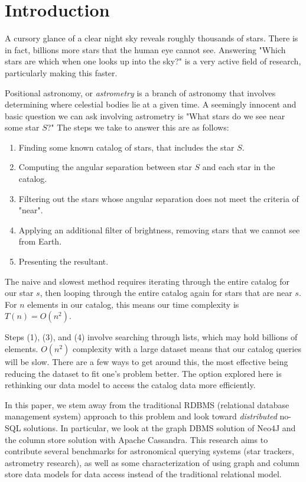 \section{Introduction}\label{sec:introduction}
A cursory glance of a clear night sky reveals roughly thousands of stars.
There is in fact, billions more stars that the human eye cannot see.
Answering "Which stars are which when one looks up into the sky?" is a very active field of research, particularly
making this faster.

Positional astronomy, or \textit{astrometry} is a branch of astronomy that involves determining where celestial
bodies lie at a given time.
A seemingly innocent and basic question we can ask involving astrometry is "What stars do we see near some star $S$?"
The steps we take to answer this are as follows:
\begin{enumerate}
    \item Finding some known catalog of stars, that includes the star $S$.
    \item Computing the angular separation between star $S$ and each star in the catalog.
    \item Filtering out the stars whose angular separation does not meet the criteria of "near".
    \item Applying an additional filter of brightness, removing stars that we cannot see from Earth.
    \item Presenting the resultant.
\end{enumerate}

The naive and slowest method requires iterating through the entire catalog for our star $s$, then looping through the
entire catalog again for stars that are near $s$.
For $n$ elements in our catalog, this means our time complexity is $T(n) = O\left( n^2 \right)$.

Steps (1), (3), and (4) involve searching through lists, which may hold billions of elements.
$O\left(n^2\right)$ complexity with a large dataset means that our catalog queries will be slow.
There are a few ways to get around this, the most effective being reducing the dataset to fit one's problem better.
The option explored here is rethinking our data model to access the catalog data more efficiently.

In this paper, we stem away from the traditional RDBMS (relational database management system) approach to this
problem and look toward \textit{distributed} no-SQL solutions.
In particular, we look at the graph DBMS solution of Neo4J and the column store solution with Apache Cassandra.
This research aims to contribute several benchmarks for astronomical querying systems (star trackers, astrometry
research), as well as some characterization of using graph and column store data models for data access instead of
the traditional relational model.